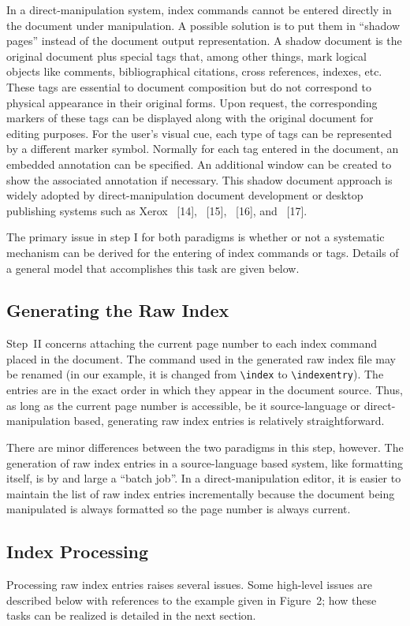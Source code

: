 In a direct-manipulation system, index commands cannot be entered directly in
the document under manipulation.  A possible solution is to put them
in ``shadow pages'' instead of the document output representation.
A shadow document is the original document plus
special tags that, among other things,
mark logical objects like comments, bibliographical citations,
cross references, indexes, etc.
These tags are essential to document composition but do not correspond to
physical appearance in their original forms.  Upon request, the corresponding
markers of these tags can be displayed along with the original document
for editing purposes.  For the user's visual cue, each type of tags can be
represented by a different marker symbol.  
Normally for each tag entered in the
document, an embedded annotation can be specified.
An additional window can be created to show the associated annotation
if necessary.  This shadow document approach is widely adopted by
direct-manipulation document development or desktop publishing systems
such as Xerox {\ST}~[14], {\FM}~[15],
{\WD}~[16], and {\VP}~[17].

The primary issue in step I for both paradigms
is whether or not a systematic mechanism
can be derived for the entering of index commands or tags.
Details of a general model that accomplishes this task are given below.


\subsection{Generating the Raw Index}
Step~II concerns attaching the current page number to each index
command placed in the document.  The command used in the generated
raw index file may be renamed (in our example, it is changed
from \verb|\index| to \verb|\indexentry|).
The entries are in the exact order in which they appear in the document source.
Thus, as long as the current page number is accessible, be it
source-language or direct-manipulation based, generating raw index entries
is relatively straightforward.

There are minor differences between the two paradigms in this step,
however.  The generation of raw index entries in a source-language based
system, like formatting itself, is by and large a ``batch job''.
In a direct-manipulation editor, it is easier to maintain the list of raw index entries
incrementally because the document being manipulated is always formatted
so the page number is always current.

\subsection{Index Processing}
Processing raw index entries raises several issues.
Some high-level issues are described below with references to the example given
in Figure~2; how these tasks can be realized is detailed in the next section.

